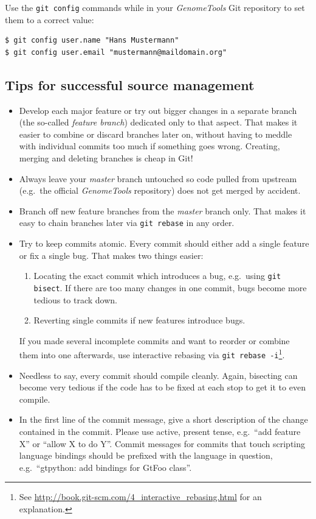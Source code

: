 \documentclass[11pt,final]{article}
\newcommand{\keyword}[1]{\lstinline{#1}}
\newcommand{\Gt}[0]{\emph{GenomeTools}\xspace}
\begin{document}
Use the \keyword{git config} commands while in your \Gt Git repository to set
them to a correct value:

\begin{lstlisting}
$ git config user.name "Hans Mustermann"
$ git config user.email "mustermann@maildomain.org"
\end{lstlisting}

\subsection{Tips for successful source management}

\begin{itemize}
\item
Develop each major feature or try out bigger changes in a separate branch
(the so-called \emph{feature branch})
dedicated only to that aspect. That makes it easier to combine or discard
branches later on, without having to meddle with individual commits too much
if something goes wrong. Creating, merging and deleting branches is cheap in
Git!
\item
Always leave your \emph{master} branch untouched so code pulled from upstream
(e.g.\ the official \Gt repository) does not get merged by accident.
\item
Branch off new feature branches from the \emph{master} branch only. That makes
it easy to chain branches later via \keyword{git rebase} in any order.
\item
Try to keep commits atomic. Every commit should either add a single feature or
fix a single bug. That makes two things easier:
\begin{enumerate}
  \item
  Locating the exact commit which introduces a bug, e.g.\ using
  \keyword{git bisect}. If there are too many changes in one commit, bugs
  become more tedious to track down.
  \item
  Reverting single commits if new features introduce bugs.
\end{enumerate}
If you made several incomplete commits and want to reorder or combine them into
one afterwards, use interactive rebasing via \keyword{git rebase
-i}\footnote{See \url{http://book.git-scm.com/4_interactive_rebasing.html} for
an explanation.}.
\item
Needless to say, every commit should compile cleanly. Again, bisecting can become
very tedious if the code has to be fixed at each stop to get it to even compile.
\item
In the first line of the commit message, give a short description of the
change contained in the commit.  Please use active, present tense,
e.g.\ ``add feature X'' or ``allow X to do Y''.
Commit messages for commits that touch scripting
language bindings should be prefixed with the language in question,
e.g.\ ``gtpython: add bindings for GtFoo class''.
\end{itemize}
\end{document}
